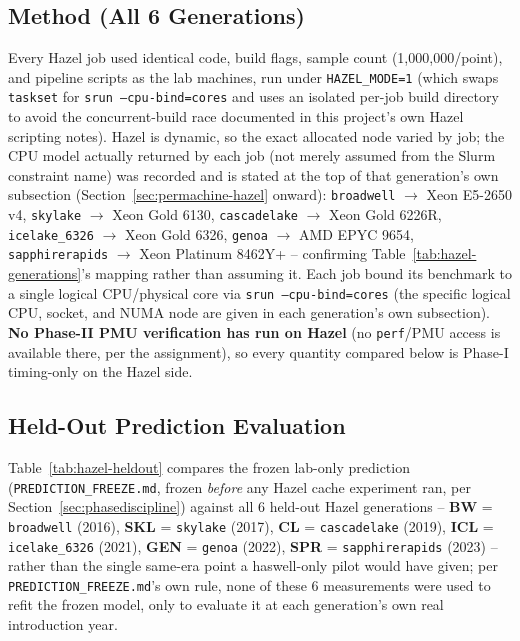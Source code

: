 \documentclass{article}
\begin{document}
\subsection{Method (All 6 Generations)}
Every Hazel job used identical code, build flags, sample count (1,000,000/point), and
pipeline scripts as the lab machines, run under \texttt{HAZEL\_MODE=1} (which swaps
\texttt{taskset} for \texttt{srun --cpu-bind=cores} and uses an isolated per-job build
directory to avoid the concurrent-build race documented in this project's own Hazel
scripting notes). Hazel is dynamic, so the exact allocated node varied by job; the CPU
model actually returned by each job (not merely assumed from the Slurm constraint name)
was recorded and is stated at the top of that generation's own subsection
(Section~\ref{sec:permachine-hazel} onward): \texttt{broadwell} $\to$ Xeon E5-2650 v4,
\texttt{skylake} $\to$ Xeon Gold 6130, \texttt{cascadelake} $\to$ Xeon Gold 6226R,
\texttt{icelake\_6326} $\to$ Xeon Gold 6326, \texttt{genoa} $\to$ AMD EPYC 9654,
\texttt{sapphirerapids} $\to$ Xeon Platinum 8462Y+ -- confirming Table~\ref{tab:hazel-generations}'s
mapping rather than assuming it. Each job bound its benchmark to a single logical
CPU/physical core via \texttt{srun --cpu-bind=cores} (the specific logical CPU, socket, and
NUMA node are given in each generation's own subsection). \textbf{No Phase-II PMU
verification has run on Hazel} (no \texttt{perf}/PMU access is available there, per the
assignment), so every quantity compared below is Phase-I timing-only on the Hazel side.

\subsection{Held-Out Prediction Evaluation}
Table~\ref{tab:hazel-heldout} compares the frozen lab-only prediction
(\texttt{PREDICTION\_FREEZE.md}, frozen \emph{before} any Hazel cache experiment ran, per
Section~\ref{sec:phasediscipline}) against all 6 held-out Hazel generations -- \textbf{BW} =
\texttt{broadwell} (2016), \textbf{SKL} = \texttt{skylake} (2017), \textbf{CL} =
\texttt{cascadelake} (2019), \textbf{ICL} = \texttt{icelake\_6326} (2021), \textbf{GEN} =
\texttt{genoa} (2022), \textbf{SPR} = \texttt{sapphirerapids} (2023) -- rather than the
single same-era point a haswell-only pilot would have given; per
\texttt{PREDICTION\_FREEZE.md}'s own rule, none of these 6 measurements were used to refit
the frozen model, only to evaluate it at each generation's own real introduction year.
\end{document}

